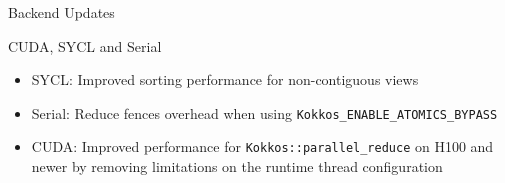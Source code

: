 
\begin{frame}[fragile]

  {\Huge Backend Updates}

  \vspace{10pt}

\end{frame}





\begin{frame}[fragile]{CUDA, SYCL and Serial}
  \begin{itemize}
      \item SYCL: Improved sorting performance for non-contiguous views
      \item Serial: Reduce fences overhead when using \texttt{Kokkos\_ENABLE\_ATOMICS\_BYPASS}
      \item CUDA: Improved performance for \texttt{Kokkos::parallel\_reduce} on H100 and newer by removing limitations on the runtime thread configuration
  \end{itemize}
\end{frame}

